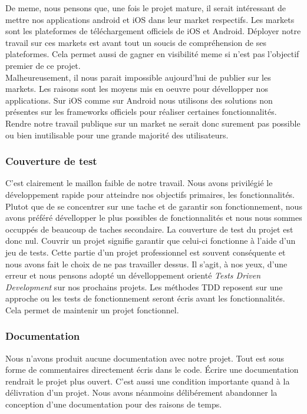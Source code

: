 De meme, nous pensons que, une fois le projet mature, il serait intéressant de mettre nos applications android et iOS dans 
leur market respectifs. Les markets sont les plateformes de téléchargement officiels de iOS et Android. Déployer notre 
travail sur ces markets est avant tout un soucis de compréhension de ses plateformes. Cela permet aussi de gagner en visibilité
meme si n'est pas l'objectif premier de ce projet.
\\
Malheureusement, il nous parait impossible aujourd'hui de publier sur les markets. Les raisons sont les moyens mis en oeuvre 
pour dévellopper nos applications. Sur iOS comme sur Android nous utilisons des solutions non présentes sur les frameworks officiels
pour réaliser certaines fonctionnalités. Rendre notre travail publique sur un market ne serait donc surement pas possible ou bien
inutilisable pour une grande majorité des utilisateurs.

\subsubsection{Couverture de test}

C'est clairement le maillon faible de notre travail. Nous avons privilégié le développement rapide pour atteindre nos objectifs
primaires, les fonctionnalités. Plutot que de se concentrer sur une tache et de garantir son fonctionnement, nous avons préféré
dévellopper le plus possibles de fonctionnalités et nous nous sommes occuppés de beaucoup de taches secondaire. La couverture 
de test du projet est donc nul. Couvrir un projet signifie garantir que celui-ci fonctionne à l'aide d'un jeu de tests. Cette partie
d'un projet professionnel est souvent conséquente et nous avons fait le choix de ne pas travailler dessus. Il s'agit, à nos yeux, 
d'une erreur et nous pensons adopté un dévelloppement orienté \textit{Tests Driven Development} sur nos prochains projets. Les méthodes
TDD reposent sur une approche ou les tests de fonctionnement seront écris avant les fonctionnalités. Cela permet de maintenir un projet
fonctionnel.

\subsubsection{Documentation}

Nous n'avons produit aucune documentation avec notre projet. Tout est sous forme de commentaires directement écris dans le code. Écrire
une documentation rendrait le projet plus ouvert. C'est aussi une condition importante quand à la délivration d'un projet. Nous avons
néanmoins délibérement abandonner la conception d'une documentation pour des raisons de temps.


